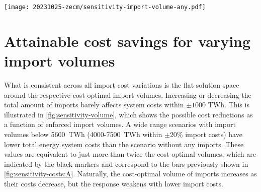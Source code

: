 

\begin{figure*}
    \texttt{[image: 20231025-zecm/sensitivity-import-volume-any.pdf]}
    \caption{\textbf{Sensitivity of import volume on total system cost and composition.}
        Dashed line splits total system cost into domestic and foreign cost.
        Dotted lines indicate the profile of lowest total system cost attainable for given import volumes and different levels of import costs.
        The black markers denote the maximum cost reductions and cost-optimal import volume for a given import cost level (extreme points of the profiles).
        Steel is included in energy terms applying 2.1 kWh/kg as released by the oxidation of iron.
        Cost alterations are uniformly applied to all imports but electricity.
    }
    \label{fig:sensitivity-volume}
\end{figure*}


\section*{Attainable cost savings for varying import volumes}

What is consistent across all import cost variations is the flat solution space
around the respective cost-optimal import volumes. Increasing or decreasing the
total amount of imports barely affects system costs within $\pm 1000$ TWh. This
is illustrated in \cref{fig:sensitivity-volume}, which shows the possible cost
reductions as a function of enforced import volumes. A wide range scenarios with
import volumes below 5600~TWh (4000-7500~TWh within $\pm$20\% import costs) have
lower total energy system costs than the scenario without any imports.
These values are equivalent
to just more than twice the cost-optimal volumes, which are indicated by the
black markers and correspond to the bars previously shown in
\cref{fig:sensitivity-costs:A}. Naturally, the cost-optimal volume of imports
increases as their costs decrease, but the response weakens with lower import
costs.

